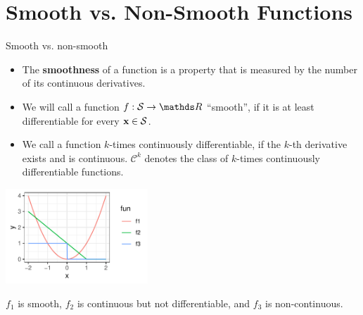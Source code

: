 












\section{Smooth vs. Non-Smooth Functions}

\begin{vbframe}{Smooth vs. non-smooth}

\begin{itemize}
\item The \textbf{smoothness} of a function is a property that is measured by the number of its continuous derivatives. 
\item We will call a function $f: \mathcal{S} \to \R$ \enquote{smooth}, if it is at least differentiable for every $\mathbf{x} \in \mathcal{S}$. 
\item We call a function $k$-times continuously differentiable, if the $k$-th derivative exists and is continuous. $\mathcal{C}^k$ denotes the class of $k$-times continuously differentiable functions. 
\end{itemize}


\begin{center}
\includegraphics[width = 0.4\textwidth]{figure_man/hinge_vs_l2.pdf} \\ 
\begin{footnotesize}
$f_1$ is smooth, $f_2$ is continuous but not differentiable, and $f_3$ is non-continuous. 
\end{footnotesize}
\end{center}


\end{vbframe}

